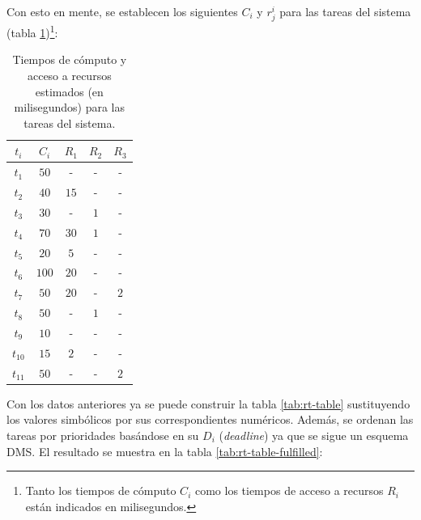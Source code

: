 Con esto en mente, se establecen los siguientes $C_i$ y $r^i_j$ para las tareas del sistema
(tabla \ref{tab:ci-rij})\footnote{Tanto los tiempos de cómputo $C_i$ como los tiempos
de acceso a recursos $R_i$ están indicados en milisegundos.}:

\begin{table}[H]
  \centering
  \begin{tabular}{|c|c|c|c|c|}
    \hline
    $t_i$    & $C_i$ & $R_1$ & $R_2$ & $R_3$ \\
    \hline
    $t_1$    & $50$  & -     & -     & -     \\
    $t_2$    & $40$  & $15$  & -     & -     \\
    $t_3$    & $30$  & -     & $1$   & -     \\
    $t_4$    & $70$  & $30$  & $1$   & -     \\
    $t_5$    & $20$  & $5$   & -     & -     \\
    $t_6$    & $100$ & $20$  & -     & -     \\
    $t_7$    & $50$  & $20$  & -     & $2$   \\
    $t_8$    & $50$  & -     & $1$   & -     \\
    $t_9$    & $10$  & -     & -     & -     \\
    $t_{10}$ & $15$  & $2$   & -     & -     \\
    $t_{11}$ & $50$  & -     & -     & $2$   \\
    \hline
  \end{tabular}
  \caption{Tiempos de cómputo y acceso a recursos estimados (en milisegundos) para las tareas del sistema.}
  \label{tab:ci-rij}
\end{table}

Con los datos anteriores ya se puede construir la tabla \ref{tab:rt-table} sustituyendo
los valores simbólicos por sus correspondientes numéricos. Además, se ordenan las tareas
por prioridades basándose en su $D_i$ (\textit{deadline}) ya que se sigue un esquema
\ac{DMS}. El resultado se muestra en la tabla \ref{tab:rt-table-fulfilled}:

